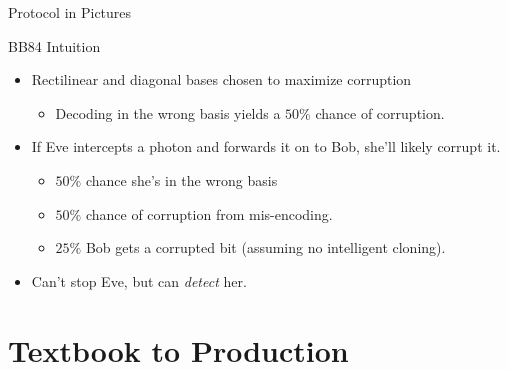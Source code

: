 \documentclass[pdf]{beamer}
\begin{document}
\begin{frame}{Protocol in Pictures}
\begin{center}
  \end{center}
  \vspace{10pt}
\end{frame}

\begin{frame}{BB84 Intuition}
  \begin{itemize}
  \item Rectilinear and diagonal bases chosen to maximize corruption
    \begin{itemize}
    \item Decoding in the wrong basis yields a $50\%$ chance of corruption.
    \end{itemize}
  \pause\item If Eve intercepts a photon and forwards it on to Bob, she'll likely
    corrupt it.
    \begin{itemize}
    \item $50\%$ chance she's in the wrong basis
    \item $50\%$ chance of corruption from mis-encoding.
    \item $25\%$ Bob gets a corrupted bit (assuming no intelligent cloning).
    \end{itemize}
  \pause\item Can't stop Eve, but can \emph{detect} her.
  \end{itemize}
\end{frame}

\section{Textbook to Production}
\end{document}

